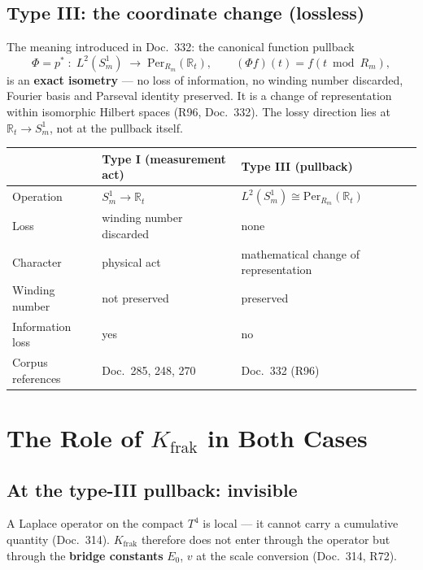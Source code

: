 \subsection{Type III: the coordinate change (lossless)}

The meaning introduced in Doc.~332: the canonical function pullback
\[
  \Phi = p^* \;:\; L^2(S^1_m) \;\longrightarrow\;
  \mathrm{Per}_{R_m}(\mathbb{R}_t), \qquad
  (\Phi f)(t) = f(t \bmod R_m),
\]
is an \textbf{exact isometry} — no loss of information, no winding
number discarded, Fourier basis and Parseval identity preserved. It is
a change of representation within isomorphic Hilbert spaces (R96,
Doc.~332). The lossy direction lies at $\mathbb{R}_t\to S^1_m$, not
at the pullback itself.

\begin{center}
\begin{tabular}{lp{4.5cm}p{4.5cm}}
\toprule
 & \textbf{Type I (measurement act)} & \textbf{Type III (pullback)} \\
\midrule
Operation & $S^1_m\to\mathbb{R}_t$ & $L^2(S^1_m)\cong\mathrm{Per}_{R_m}(\mathbb{R}_t)$ \\
Loss & winding number discarded & none \\
Character & physical act & mathematical change of representation \\
Winding number & not preserved & preserved \\
Information loss & yes & no \\
Corpus references & Doc.~285, 248, 270 & Doc.~332 (R96) \\
\bottomrule
\end{tabular}
\end{center}

\section{The Role of $K_{\text{frak}}$ in Both Cases}

\subsection{At the type-III pullback: invisible}

A Laplace operator on the compact $T^4$ is local — it cannot carry a
cumulative quantity (Doc.~314). $K_{\text{frak}}$ therefore does not
enter through the operator but through the \textbf{bridge constants}
$E_0$, $v$ at the scale conversion (Doc.~314, R72).

